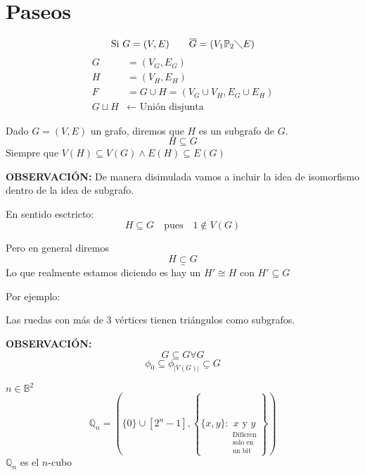 \documentclass[../main.tex]{subfiles}
\begin{document}
\chapter{Paseos}%

\thispagestyle{fancy}

\begin{figure}[H]
	\centering
	
\end{figure}

\[
	\text{Si } G=(V,E)\qquad \overline{G}=(V_1\mathbb{P}_2 \diagdown E)
\]
\begin{align*}
	G &= (V_G,E_G)\\
	H &= (V_H,E_H)\\
	F &= G \cup H = (V_G \cup V_H, E_G \cup E_H)\\
	G \sqcup H &\leftarrow \text{ Unión disjunta}
\end{align*}

Dado $G=(V,E)$ un grafo, diremos que $H$ es un subgrafo de $G$.
\[
	H \subseteq G
\]
Siempre que $V(H)\subseteq V(G) \wedge E(H) \subseteq E(G)$

\textbf{OBSERVACIÓN:}
De manera disimulada vamos a incluir la idea de isomorfismo dentro de la idea
de subgrafo.

\begin{figure}[H]
	\centering
	
\end{figure}

En sentido esctricto:
\[
	H \subseteq G \quad \text{pues} \quad 1 \notin V(G)
\]

Pero en general diremos
\[
	H
	\underset
	{\text{\textasciitilde}}
	{
		\subset
	}
	G
\]
Lo que realmente estamos diciendo es hay un $H'\cong H$ con $H'\subseteq G$

Por ejemplo:

Las ruedas con más de 3 vértices tienen triángulos como subgrafos.

\textbf{OBSERVACIÓN:}
\[
	G \subseteq G \forall G
\]
\[
	\phi_0 \subseteq \phi_{|V(G)|}
	\underset
	{
		{\text{\textasciitilde}}
	}
	{
		\subset
	}
	G
\]

\begin{figure}[H]
	\centering
	
\end{figure}

$n\in \mathbb{B}^2$
\[
	\mathbb{Q}_n =
	\left(
		\{0\}
		\cup
		[2^n-1],
		\left\{
			\{x,y\}:
			\underset
			{
				\substack
				{
					\text{Difieren}\\
					\text{solo en}\\
					\text{un bit}
				}
			}
			{
				x\text{ y }y
			}
		\right\}
	\right)
\]
$\mathbb{Q}_n$ es el $n$-cubo
\end{document}
